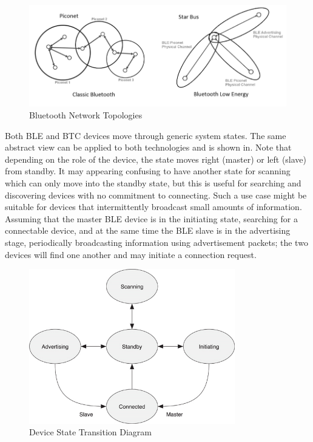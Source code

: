 \documentclass[]{article}
\begin{document}
\begin{figure}[htb]
	\begin{center}
		\includegraphics[width = \textwidth]{topology}
	\end{center}
	\caption{Bluetooth Network Topologies }
	\label{fig:topology}
\end{figure}

Both BLE and BTC devices move through generic system states. The same abstract view can be applied to both technologies and is shown in. Note that depending on the role of the device, the state moves right (master) or left (slave) from standby. It may appearing confusing to have another state for scanning which can only move into the standby state, but this is useful for searching and discovering devices with no commitment to connecting. Such a use case might be suitable for devices that intermittently broadcast small amounts of information. Assuming that the master BLE device is in the initiating state, searching for a connectable device, and at the same time the BLE slave is in the advertising stage, periodically broadcasting information using advertisement packets; the two devices will find one another and may initiate a connection request.

\begin{figure}[h]
	\begin{center}
		\includegraphics[width = 0.8\textwidth]{systemstate}
	\end{center}
	\caption{Device State Transition Diagram}
	\label{fig:systemstate}
\end{figure}
\end{document}
